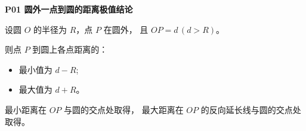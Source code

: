 \begin{statementbox}
\textbf{P01 圆外一点到圆的距离极值结论}

设圆 $O$ 的半径为 $R$，点 $P$ 在圆外，
且 $OP=d\,(d>R)$。

则点 $P$ 到圆上各点距离的：

\begin{itemize}
  \item 最小值为 $d-R$;
  \item 最大值为 $d+R$。
\end{itemize}

最小距离在 $OP$ 与圆的交点处取得，
最大距离在 $OP$ 的反向延长线与圆的交点处取得。
\begin{center}

\end{center}

\begin{center}

\end{center}

\end{statementbox}

